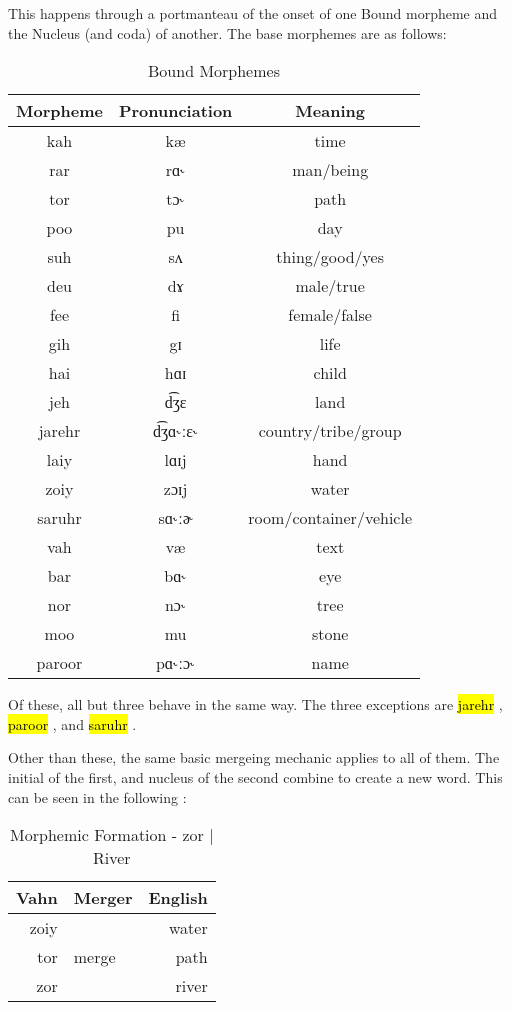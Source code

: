 \documentclass{article}
\newcommand{\hlv}[2][gray]{ {\sethlcolor{#1} \hl{#2}} }
\begin{document}
This happens through a portmanteau of the onset of one Bound morpheme and the Nucleus (and coda) of another. The base morphemes are as follows:

\begin{table}[H]
\centering
\begin{tabular}{c|c|c}
 Morpheme & Pronunciation & Meaning \\
 \hline
 kah & kæ & time \\
 rar & rɑ˞ & man/being \\
 tor & tɔ˞ & path \\
 poo & pu & day \\
 suh & sʌ & thing/good/yes\\
 deu & dɤ & male/true \\
 fee & fi & female/false \\
 gih & gɪ & life \\
 hai & hɑɪ & child \\
 jeh & d͡ʒɛ & land \\
 jarehr & d͡ʒɑ˞ːɛ˞ & country/tribe/group \\
 laiy & lɑɪj & hand \\
 zoiy & zɔɪj & water \\
 saruhr & sɑ˞ːɚ & room/container/vehicle \\
 vah & væ & text \\
 bar & bɑ˞ & eye \\
 nor & nɔ˞ & tree \\
 moo & mu & stone \\
 paroor & pɑ˞ːɔ˞ & name \\
\end{tabular}
\caption{Bound Morphemes}
\label{Bound Morphemes}
\end{table}

Of these, all but three behave in the same way. The three exceptions are \hlv{jarehr}, \hlv{paroor}, and \hlv{saruhr}.

Other than these, the same basic mergeing mechanic applies to all of them. The initial of the first, and nucleus of the second combine to create a new word. This can be seen in the following :

\begin{table}[H]
\centering
\begin{tabular}{r|l||r}
Vahn     & Merger & English  \\
\hline\hline
zoiy &       & water      \\
tor & merge  & path    \\
\hline \hline
zor &        & river
\end{tabular}
\caption{Morphemic Formation - zor | River}
\label{Morphemic Formation - zor | River}
\end{table}
\end{document}
